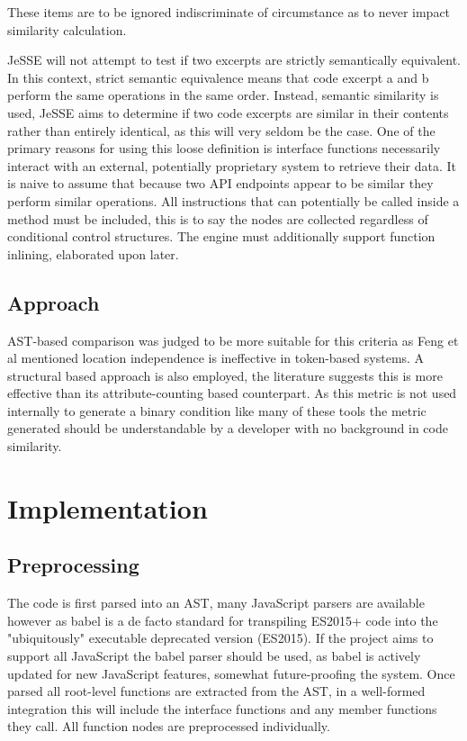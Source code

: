 \documentclass[jou,apacite]{apa6}
\begin{document}
These items are to be ignored indiscriminate of circumstance as to never impact similarity calculation. 

JeSSE will not attempt to test if two excerpts are strictly semantically equivalent. In this context,  strict semantic equivalence means that code excerpt a and b perform the same operations in the same order. Instead, semantic similarity is used, JeSSE aims to determine if two code excerpts are similar in their contents rather than entirely identical, as this will very seldom be the case. One of the primary reasons for using this loose definition is interface functions necessarily interact with an external, potentially proprietary system to retrieve their data. It is naive to assume that because two API endpoints appear to be similar they perform similar operations. 
All instructions that can potentially be called inside a method must be included, this is to say the nodes are collected regardless of conditional control structures. The engine must additionally support function inlining, elaborated upon later.

\subsection{Approach}
AST-based comparison was judged to be more suitable for this criteria as Feng et al mentioned location independence is ineffective in token-based systems. A structural based approach is also employed, the literature suggests this is more effective than its attribute-counting based counterpart. As this metric is not used internally to generate a binary condition like many of these tools the metric generated should be understandable by a developer with no background in code similarity.

\section{Implementation}
\subsection{Preprocessing}
The code is first parsed into an AST, many JavaScript parsers are available however as babel is a de facto standard for transpiling ES2015+ code into the "ubiquitously" executable deprecated version (ES2015). If the project aims to support all JavaScript the babel parser should be used, as babel is actively updated for new JavaScript features, somewhat future-proofing the system. Once parsed all root-level functions are extracted from the AST,  in a well-formed integration this will include the interface functions and any member functions they call. All function nodes are preprocessed individually.
\end{document}
